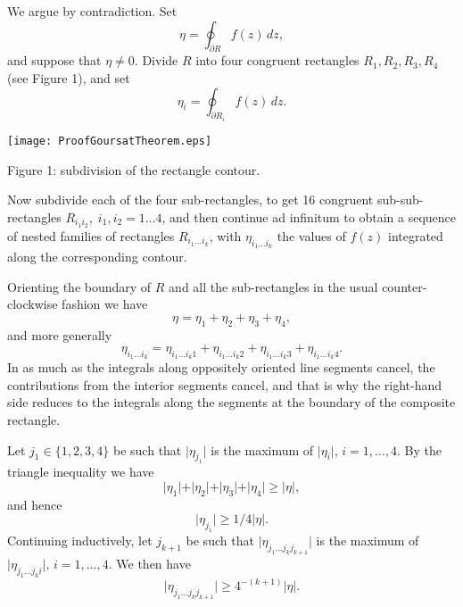 \documentclass[12pt]{article}
\begin{document}
We argue by contradiction.  Set
$$\eta = \oint_{\partial R} f(z)\, dz,$$
and suppose that $\eta\neq
0$. Divide $R$ into four congruent rectangles $R_1, R_2, R_3, R_4$
(see Figure 1), and set
$$\eta_i = \oint_{\partial R_i} f(z)\, dz.$$

  \begin{center}
    \texttt{[image: ProofGoursatTheorem.eps]}

    {\tiny Figure 1: subdivision of the rectangle contour.}
  \end{center}
  
  Now subdivide each of the four sub-rectangles, to get 16 congruent
  sub-sub-rectangles $R_{i_1i_2},\; i_1,i_2=1\ldots 4$, and then continue ad
  infinitum to obtain a sequence of nested families of rectangles
  $R_{i_1\ldots i_k}$, with $\eta_{i_1\ldots i_k}$ the values of $f(z)$
  integrated along the corresponding contour.

Orienting the boundary of
$R$ and all the sub-rectangles in the usual counter-clockwise fashion
we have
$$\eta = \eta_1+\eta_2+\eta_3+\eta_4,$$
and more generally
$$\eta_{i_1\ldots i_k} = \eta_{i_1\ldots i_k1}+\eta_{i_1\ldots i_k2}+\eta_{i_1\ldots i_k3}+\eta_{i_1\ldots i_k4}.$$
In as much as the integrals along oppositely oriented line
segments cancel, the contributions from the interior segments cancel,
and that is why the right-hand side reduces to the integrals along the
segments at the boundary of the composite rectangle.

Let $j_1\in\{1,2,3,4\}$ be such that $\vert\eta_{j_1}\vert$ is the maximum of
$\vert \eta_i \vert,\, i=1,\ldots,4$. By the triangle inequality we have
$$\vert\eta_1\vert+\vert\eta_2\vert+\vert\eta_3\vert+\vert\eta_4\vert \geq \vert\eta\vert,$$
and hence
$$\vert\eta_{j_1}\vert\geq 1/4 \vert\eta\vert.$$
Continuing inductively, let $j_{k+1}$ be such that 
$\vert\eta_{j_1\ldots j_k j_{k+1}}\vert$ is the maximum of
$\vert\eta_{j_1 \ldots j_k i}\vert,\, i=1,\ldots,4$.  We then have
\begin{equation}
  \label{eq:etaest}
\vert\eta_{j_1\ldots j_k j_{k+1}}\vert \geq 4^{-(k+1)} |\eta|.  
\end{equation}
\end{document}
